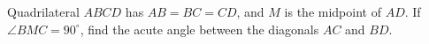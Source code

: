 Quadrilateral $ABCD$ has $AB=BC=CD$, and $M$ is the midpoint of $AD$. If $\angle BMC=90^\circ$, find the acute angle between the diagonals $AC$ and $BD$.
